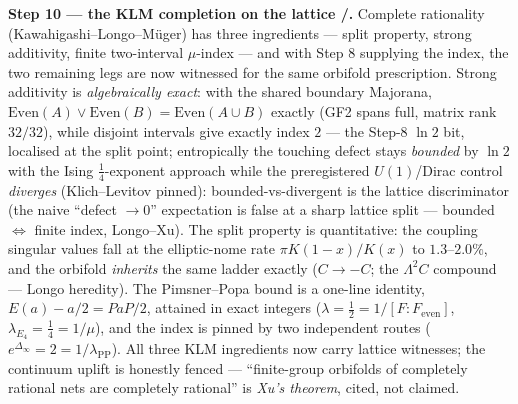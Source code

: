 \documentclass[11pt,a4paper]{article}
\theoremstyle{definition}
\begin{document}
\par\smallskip\noindent\textbf{Step 10 --- the KLM completion on the lattice \mE/\mC.} Complete
rationality (Kawahigashi--Longo--M\"uger) has three ingredients --- split property, strong
additivity, finite two-interval $\mu$-index --- and with Step 8 supplying the index, the two
remaining legs are now witnessed for the same orbifold prescription. Strong additivity is
\emph{algebraically exact}: with the shared boundary Majorana,
$\mathrm{Even}(A)\vee\mathrm{Even}(B)=\mathrm{Even}(A\cup B)$ exactly (GF2 spans full, matrix rank
$32/32$), while disjoint intervals give exactly index $2$ --- the Step-8 $\ln2$ bit, localised at
the split point; entropically the touching defect stays \emph{bounded} by $\ln2$ with the Ising
$\tfrac14$-exponent approach while the preregistered $U(1)$/Dirac control \emph{diverges}
(Klich--Levitov pinned): bounded-vs-divergent is the lattice discriminator (the naive
``defect $\to0$'' expectation is false at a sharp lattice split --- bounded $\Leftrightarrow$
finite index, Longo--Xu). The split property is quantitative: the coupling singular values fall at
the elliptic-nome rate $\pi K(1-x)/K(x)$ to $1.3$--$2.0\%$, and the orbifold \emph{inherits} the
same ladder exactly ($C\to-C$; the $\Lambda^2C$ compound --- Longo heredity). The Pimsner--Popa
bound is a one-line identity, $E(a)-a/2=PaP/2$, attained in exact integers
($\lambda=\tfrac12=1/[F:F_{\mathrm{even}}]$, $\lambda_{E_4}=\tfrac14=1/\mu$), and the index is
pinned by two independent routes ($e^{\Delta_\infty}=2=1/\lambda_{\mathrm{PP}}$). All three KLM
ingredients now carry lattice witnesses; the continuum uplift is honestly fenced --- ``finite-group
orbifolds of completely rational nets are completely rational'' is \emph{Xu's theorem}, cited, not
claimed. 
\end{document}
